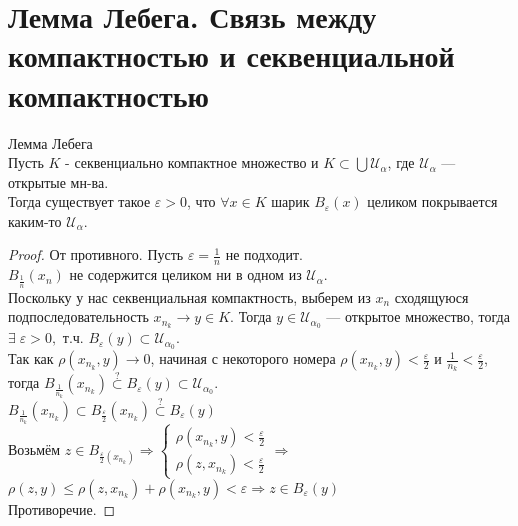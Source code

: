 \section{Лемма Лебега. Связь между компактностью и секвенциальной компактностью}

\begin{lemma}
    Лемма Лебега \\
    
    Пусть $K$ - секвенциально компактное множество
    и $K \subset \bigcup \mathcal{U_{\alpha}}$, где $\mathcal{U_{\alpha}}$ --- открытые мн-ва. \\
    Тогда существует такое $\varepsilon > 0$, что $\forall x \in K$ шарик $B_{\varepsilon}(x)$ целиком покрывается каким-то $\mathcal{U_{\alpha}}$.
    \begin{proof}
        От противного. Пусть $\varepsilon = \frac{1}{n}$ не подходит. \\
         $B_{\frac{1}{n}}(x_n)$ не содержится целиком ни в одном из $\mathcal{U_{\alpha}}$.  \\
         Поскольку у нас секвенциальная компактность, выберем из $x_n$ сходящуюся подпоследовательность $x_{n_k} \rightarrow y \in K$.
         Тогда $y \in \mathcal{U}_{{\alpha}_0}$ --- открытое множество, тогда $\exists \; \varepsilon > 0,$ т.ч. $B_{\varepsilon}(y) \subset \mathcal{U}_{{\alpha}_0}$. \\
         Так как $\rho(x_{n_k},y)\rightarrow 0$, начиная с некоторого номера $\rho(x_{n_k},y) < \frac{\varepsilon}{2}$ и $\frac{1}{n_k} < \frac{\varepsilon}{2}$, \\
         тогда $B_{\frac{1}{n_k}}(x_{n_k}) \stackrel{?}{\subset} B_{\varepsilon}(y) \subset \mathcal{U}_{{\alpha}_0}$. \\
         $B_{\frac{1}{n_k}}(x_{n_k}) \subset B_{\frac{\varepsilon}{2}}(x_{n_k}) \stackrel{?}{\subset} B_{\varepsilon}(y)$ \\
         Возьмём $z \in B_{\frac{\varepsilon}{2}(x_{n_k})} \Longrightarrow 
         \begin{cases}
             \rho(x_{n_k},y) < \frac{\varepsilon}{2} \\
             \rho(z,x_{n_k}) < \frac{\varepsilon}{2}
         \end{cases} \Longrightarrow$ 
        $\rho(z,y) \leqslant \rho (z, x_{n_k}) + \rho (x_{n_k},y) < \varepsilon \Longrightarrow z \in B_{\varepsilon}(y)$ \\
        Противоречие.
    \end{proof}

\end{lemma}

